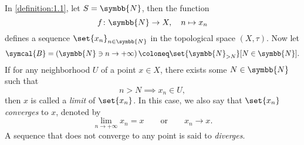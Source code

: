 
\begin{example}
    In \cref{definition:1.1}, let \(S=\symbb{N}\), then the function
    \begin{equation}
        f\colon\symbb{N}\to X,\quad n\mapsto x_n
    \end{equation}
    defines a sequence \(\set{x_n}_{n\in\symbb{N}}\) in the topological space \(\left(X,\tau\right)\). Now let
    \begin{equation}
        \symcal{B}=\left(\symbb{N}\ni n\to+\infty\right)\coloneq\set{\symbb{N}_{>N}}[N\in\symbb{N}].
    \end{equation}
    If for any neighborhood \(U\) of a point \(x\in X\), there exists some \(N\in\symbb{N}\) such that
    \begin{equation}
        n>N\implies x_n\in U,
    \end{equation}then \(x\) is called a \emph{limit} of \(\set{x_n}\). In this case, we also say that \(\set{x_n}\) \emph{converges} to \(x\), denoted by
    \begin{equation}
        \lim_{n\to+\infty}x_n=x\qquad\text{or}\qquad x_n\to x.
    \end{equation}
    A sequence that does not converge to any point is said to \emph{diverges}.
\end{example}

